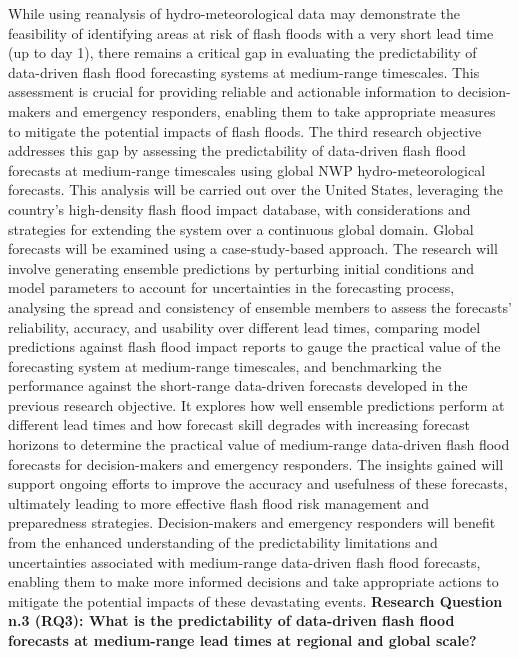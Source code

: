 While  using reanalysis of hydro-meteorological data may demonstrate the feasibility of identifying areas at risk of flash floods with a very short lead time (up to day 1), there remains a critical gap in evaluating the predictability of data-driven flash flood forecasting systems at medium-range timescales. This assessment is crucial for providing reliable and actionable information to decision-makers and emergency responders, enabling them to take appropriate measures to mitigate the potential impacts of flash floods. The third research objective addresses this gap by assessing the predictability of data-driven flash flood forecasts at medium-range timescales using global NWP hydro-meteorological forecasts. This analysis will be carried out over the United States, leveraging the country's high-density flash flood impact database, with considerations and strategies for extending the system over a continuous global domain. Global forecasts will be examined using a case-study-based approach. The research will involve generating ensemble predictions by perturbing initial conditions and model parameters to account for uncertainties in the forecasting process, analysing the spread and consistency of ensemble members to assess the forecasts' reliability, accuracy, and usability over different lead times, comparing model predictions against flash flood impact reports to gauge the practical value of the forecasting system at medium-range timescales, and benchmarking the performance against the short-range data-driven forecasts developed in the previous research objective. It explores how well ensemble predictions perform at different lead times and how forecast skill degrades with increasing forecast horizons to determine the practical value of medium-range data-driven flash flood forecasts for decision-makers and emergency responders. The insights gained will support ongoing efforts to improve the accuracy and usefulness of these forecasts, ultimately leading to more effective flash flood risk management and preparedness strategies. Decision-makers and emergency responders will benefit from the enhanced understanding of the predictability limitations and uncertainties associated with medium-range data-driven flash flood forecasts, enabling them to make more informed decisions and take appropriate actions to mitigate the potential impacts of these devastating events. \textbf{Research Question n.3 (RQ3): What is the predictability of data-driven flash flood forecasts at medium-range lead times at regional and global scale?}


